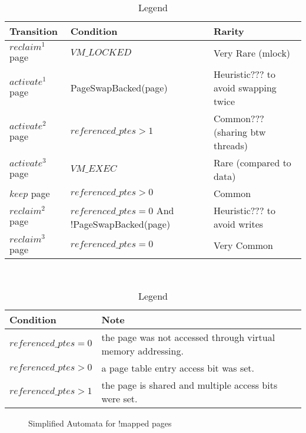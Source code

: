 \documentclass{article}
\begin{document}
\begin{table}
\begin{tabular}{|l|l|l|}
\hline
Transition & Condition & Rarity \\
\hline
$reclaim^1$  page & $VM\_LOCKED$                                     & Very Rare (mlock) \\
$activate^1$ page & PageSwapBacked(page)                             & Heuristic??? to avoid swapping twice \\
$activate^2$ page & $referenced\_ptes > 1$                           & Common??? (sharing btw threads) \\
$activate^3$ page & $VM\_EXEC$                                       & Rare (compared to data) \\
$keep$       page & $referenced\_ptes > 0$                           & Common \\
$reclaim^2$  page & $referenced\_ptes = 0$ And !PageSwapBacked(page) & Heuristic??? to avoid writes \\
$reclaim^3$  page & $referenced\_ptes = 0$                           & Very Common \\
\hline
\end{tabular}
\\
\begin{tabular}{|l|l|}
\hline
Condition               & Note \\
\hline
$referenced\_ptes = 0$ & the page was not accessed through virtual memory addressing. \\
$referenced\_ptes > 0$ & a page table entry access bit was set. \\
$referenced\_ptes > 1$ & the page is shared and multiple access bits were set. \\
\hline
\end{tabular}
\caption{Legend}
\end{table}
\begin{figure}
\begin{center}
\end{center}
\caption{Simplified Automata for !mapped pages}
\end{figure}
\end{document}
